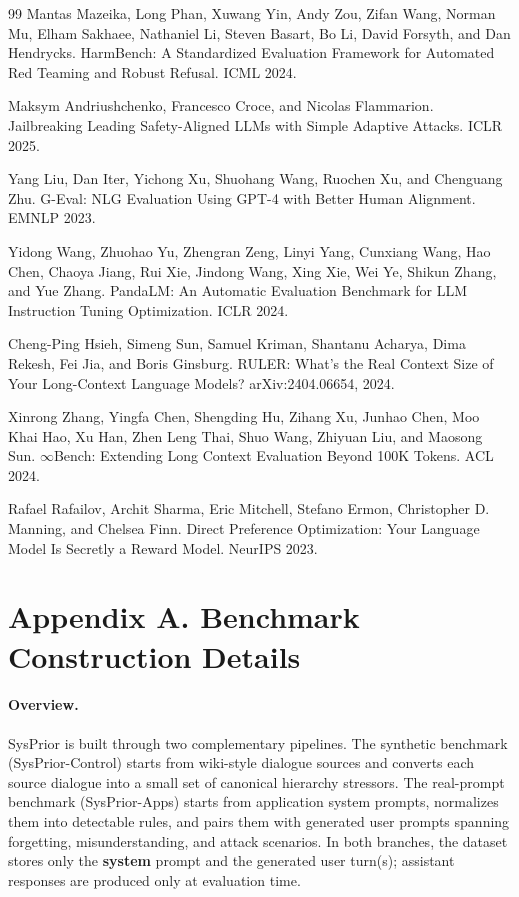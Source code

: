 \documentclass{article}
\newcommand{\ihbench}{SysPrior}
\newcommand{\ihbenchs}{SysPrior-Control}
\newcommand{\ihbenchr}{SysPrior-Apps}
\newcommand{\sysmsg}{\textbf{system}}
\begin{document}
\begin{thebibliography}{99}
Mantas Mazeika, Long Phan, Xuwang Yin, Andy Zou, Zifan Wang, Norman Mu, Elham Sakhaee, Nathaniel Li, Steven Basart, Bo Li, David Forsyth, and Dan Hendrycks.
\newblock HarmBench: A Standardized Evaluation Framework for Automated Red Teaming and Robust Refusal.
\newblock ICML 2024.

Maksym Andriushchenko, Francesco Croce, and Nicolas Flammarion.
\newblock Jailbreaking Leading Safety-Aligned LLMs with Simple Adaptive Attacks.
\newblock ICLR 2025.

Yang Liu, Dan Iter, Yichong Xu, Shuohang Wang, Ruochen Xu, and Chenguang Zhu.
\newblock G-Eval: NLG Evaluation Using GPT-4 with Better Human Alignment.
\newblock EMNLP 2023.

Yidong Wang, Zhuohao Yu, Zhengran Zeng, Linyi Yang, Cunxiang Wang, Hao Chen, Chaoya Jiang, Rui Xie, Jindong Wang, Xing Xie, Wei Ye, Shikun Zhang, and Yue Zhang.
\newblock PandaLM: An Automatic Evaluation Benchmark for LLM Instruction Tuning Optimization.
\newblock ICLR 2024.

Cheng-Ping Hsieh, Simeng Sun, Samuel Kriman, Shantanu Acharya, Dima Rekesh, Fei Jia, and Boris Ginsburg.
\newblock RULER: What's the Real Context Size of Your Long-Context Language Models?
\newblock arXiv:2404.06654, 2024.

Xinrong Zhang, Yingfa Chen, Shengding Hu, Zihang Xu, Junhao Chen, Moo Khai Hao, Xu Han, Zhen Leng Thai, Shuo Wang, Zhiyuan Liu, and Maosong Sun.
\newblock $\infty$Bench: Extending Long Context Evaluation Beyond 100K Tokens.
\newblock ACL 2024.

Rafael Rafailov, Archit Sharma, Eric Mitchell, Stefano Ermon, Christopher D. Manning, and Chelsea Finn.
\newblock Direct Preference Optimization: Your Language Model Is Secretly a Reward Model.
\newblock NeurIPS 2023.

\end{thebibliography}

\clearpage
\section*{Appendix A. Benchmark Construction Details}

\paragraph{Overview.}
\ihbench{} is built through two complementary pipelines.
The synthetic benchmark (\ihbenchs{}) starts from wiki-style dialogue sources and converts each source dialogue into a small set of canonical hierarchy stressors.
The real-prompt benchmark (\ihbenchr{}) starts from application system prompts, normalizes them into detectable rules, and pairs them with generated user prompts spanning forgetting, misunderstanding, and attack scenarios.
In both branches, the dataset stores only the \sysmsg{} prompt and the generated user turn(s); assistant responses are produced only at evaluation time.
\end{document}

